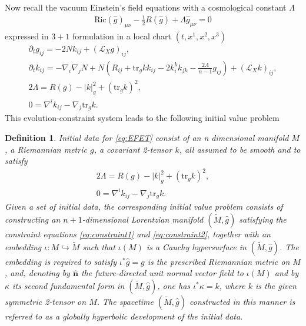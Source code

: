 \documentclass{amsart}
\newtheorem{definition}{Definition}
\newcommand{\tr}{\mbox{tr}}
\begin{document}
\noindent Now recall the vacuum Einstein's field equations with a cosmological constant $\Lambda$
\begin{align}
\label{eq:EFET}
 \text{Ric}(\widehat{g})_{\mu\nu}-\frac{1}{2}R(\widehat{g})+\Lambda\widehat{g}_{\mu\nu}=0   
\end{align}
expressed in $3+1$ formulation in a local chart $(t,x^{1},x^{2},x^{3})$ 
\begin{align}
\partial_{t}g_{ij}=-2Nk_{ij}+(\mathscr{L}_{X}g)_{ij},\\
\partial_{t}k_{ij}=-\nabla_{i}\nabla_{j}N+N(R_{ij}+\tr_{g}k k_{ij}-2k^{k}_{i}k_{jk}-\frac{2\Lambda}{n-1}g_{ij})+(\mathscr{L}_{X}k)_{ij},\\
2\Lambda=R(g)-|k|^{2}_{g}+(\tr_{g}k)^{2},\\
0=\nabla^{i}k_{ij}-\nabla_{j}\tr_{g}k.   
\end{align}
This evolution-constraint system leads to the following initial value problem
\begin{definition}
Initial data for \ref{eq:EFET} consist of an n dimensional manifold $M$, a Riemannian metric $g$, a covariant 2-tensor $k$, all assumed to be smooth and to satisfy 
\begin{align}
\label{eq:constraint1}
2\Lambda=R(g)-|k|^{2}_{g}+(\tr_{g}k)^{2},\\
\label{eq:constraint2}
0=\nabla^{i}k_{ij}-\nabla_{j}\tr_{g}k.       
\end{align}
Given a set of initial data, the corresponding initial value problem consists of constructing an $n+1$-dimensional Lorentzian manifold $(\widetilde{M},\widehat{g})$ satisfying the constraint equations \eqref{eq:constraint1} and \eqref{eq:constraint2}, together with an embedding $\iota:M\hookrightarrow \widetilde{M}$
such that $\iota(M)$ is a Cauchy hypersurface in $(\widetilde{M},\widehat{g})$. The embedding is required to satisfy $\iota^{*}\widehat{g}=g$ is the prescribed Riemannian metric on $M$, and, denoting by $\widehat{\mathbf{n}}$ the future-directed unit normal vector field to $\iota(M)$ and by $\kappa$ its second fundamental form in $(\widetilde{M},\widehat{g})$, one has $\iota^{*}\kappa=k$, where $k$ is the given symmetric 2-tensor on $M$. The spacetime $(\widetilde{M},\widehat{g})$ constructed in this manner is referred to as a globally hyperbolic development of the initial data.
\end{definition}
\end{document}
